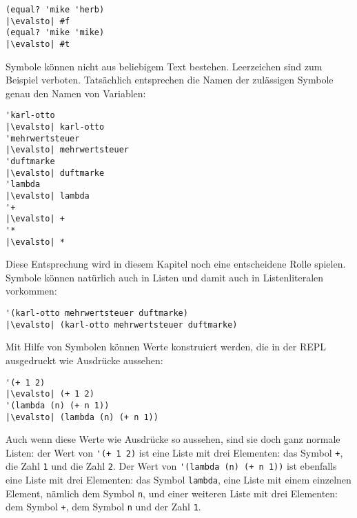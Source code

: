 \begin{lstlisting}
(equal? 'mike 'herb)
|\evalsto| #f
(equal? 'mike 'mike)
|\evalsto| #t
\end{lstlisting}

Symbole können nicht aus beliebigem Text bestehen.  
Leerzeichen sind zum Beispiel verboten.  Tatsächlich entsprechen die
Namen der zulässigen Symbole genau den Namen von Variablen:
%
\begin{lstlisting}
'karl-otto
|\evalsto| karl-otto
'mehrwertsteuer
|\evalsto| mehrwertsteuer
'duftmarke
|\evalsto| duftmarke
'lambda
|\evalsto| lambda
'+
|\evalsto| +
'*
|\evalsto| *
\end{lstlisting}
%
Diese Entsprechung wird in diesem Kapitel noch eine entscheidene Rolle
spielen.  Symbole können natürlich auch in Listen und damit auch in
Listenliteralen vorkommen:
%
\begin{lstlisting}
'(karl-otto mehrwertsteuer duftmarke)
|\evalsto| (karl-otto mehrwertsteuer duftmarke)
\end{lstlisting}
%
Mit Hilfe von Symbolen können Werte konstruiert werden, die in der REPL
ausgedruckt wie Ausdrücke aussehen:
%
\begin{lstlisting}
'(+ 1 2)
|\evalsto| (+ 1 2)
'(lambda (n) (+ n 1))
|\evalsto| (lambda (n) (+ n 1))
\end{lstlisting}
%
Auch wenn diese Werte wie Ausdrücke so aussehen, sind sie doch ganz
normale Listen: der Wert von \verb|'(+ 1 2)| ist eine Liste mit drei
Elementen: das Symbol \verb|+|, die Zahl \lstinline{1} und die Zahl
\lstinline{2}.  Der Wert von \verb|'(lambda (n) (+ n 1))| ist ebenfalls
eine Liste mit drei Elementen: das Symbol \verb|lambda|, eine Liste
mit einem einzelnen Element, nämlich dem Symbol \lstinline{n}, und einer
weiteren Liste mit drei Elementen: dem Symbol \lstinline{+}, dem Symbol
\lstinline{n} und der Zahl \lstinline{1}.

